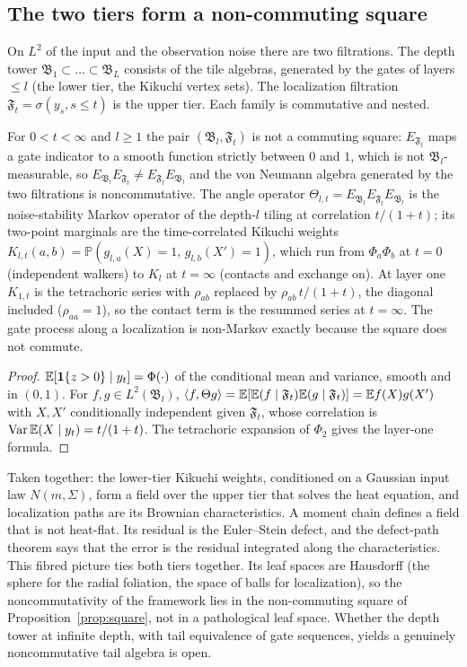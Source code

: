 \subsection{The two tiers form a non-commuting square}
On $L^2$ of the input and the observation noise there are two filtrations. The depth tower $\mathfrak B_1\subset\dots\subset\mathfrak B_L$ consists of the tile
algebras, generated by the gates of layers $\le l$ (the lower tier, the Kikuchi vertex sets). The localization filtration $\mathfrak F_t=\sigma(y_s,s\le t)$
is the upper tier. Each family is commutative and nested.
\begin{proposition}\label{prop:square}
For $0<t<\infty$ and $l\ge1$ the pair $(\mathfrak B_l,\mathfrak F_t)$ is not a commuting square: $E_{\mathfrak F_t}$ maps a gate indicator to a smooth function strictly
between $0$ and $1$, which is not $\mathfrak B_l$-measurable, so $E_{\mathfrak B_l}E_{\mathfrak F_t}\ne E_{\mathfrak F_t}E_{\mathfrak B_l}$ and the von Neumann algebra generated by the two filtrations
is noncommutative. The angle operator $\Theta_{l,t}=E_{\mathfrak B_l}E_{\mathfrak F_t}E_{\mathfrak B_l}$ is the noise-stability Markov operator of the depth-$l$ tiling at
correlation $t/(1+t)$; its two-point marginals are the time-correlated Kikuchi weights
$K_{l,t}(a,b)=\mathbb P(g_{l,a}(X)=1,\,g_{l,b}(X')=1)$, which run from $\Phi_a\Phi_b$ at $t=0$ (independent walkers) to $K_l$ at $t=\infty$ (contacts and exchange on).
At layer one $K_{1,t}$ is the tetrachoric series with $\rho_{ab}$ replaced by $\rho_{ab}\,t/(1+t)$, the diagonal included ($\rho_{aa}=1$), so the contact
term is the resummed series at $t=\infty$. The gate process along a localization is non-Markov exactly because the square does not commute.
\end{proposition}
\begin{proof}
$\mathbb E[\mathbf 1\{z>0\}\mid y_t]=\Phi(\cdot)$ of the conditional mean and variance, smooth and in $(0,1)$. For $f,g\in L^2(\mathfrak B_l)$,
$\langle f,\Theta g\rangle=\mathbb E[\mathbb E(f\mid\mathfrak F_t)\mathbb E(g\mid\mathfrak F_t)]=\mathbb E f(X)g(X')$ with $X,X'$ conditionally independent given $\mathfrak F_t$, whose correlation is
$\operatorname{Var}\mathbb E(X\mid y_t)=t/(1+t)$. The tetrachoric expansion of $\Phi_2$ gives the layer-one formula.
\end{proof}
Taken together: the lower-tier Kikuchi weights, conditioned on a Gaussian input law $N(m,\Sigma)$, form a field over the upper tier
that solves the heat equation, and localization paths are its Brownian characteristics. A moment chain defines a field that is
not heat-flat. Its residual is the Euler--Stein defect, and the defect-path theorem says that the error is the residual integrated
along the characteristics. This fibred picture ties both tiers together. Its leaf spaces are Hausdorff (the sphere for the radial
foliation, the space of balls for localization), so the noncommutativity of the framework lies in the non-commuting square of
Proposition~\ref{prop:square}, not in a pathological leaf space. Whether the depth tower at infinite depth, with tail equivalence of gate
sequences, yields a genuinely noncommutative tail algebra is open.
